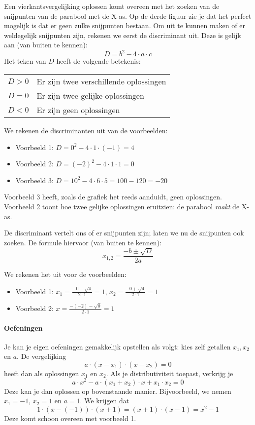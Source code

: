 \documentclass[a4paper]{article}
\begin{document}
Een vierkantsvergelijking oplossen komt overeen met het zoeken van de snijpunten van de parabool
met de X-as. Op de derde figuur zie je dat het perfect mogelijk is dat er geen zulke snijpunten bestaan.
Om uit te kunnen maken of er weldegelijk snijpunten zijn, rekenen we eerst de discriminant uit.
Deze is gelijk aan (van buiten te kennen):
\[
  D = b^2 - 4 \cdot a \cdot c
\]
Het teken van $D$ heeft de volgende betekenis:
\begin{center}
  \begin{tabular}{cl}
    $D > 0$ & Er zijn twee verschillende oplossingen \\
    $D = 0$ & Er zijn twee gelijke oplossingen \\
    $D < 0$ & Er zijn geen oplossingen
  \end{tabular}
\end{center}
We rekenen de discriminanten uit van de voorbeelden:
\begin{itemize}
  \item Voorbeeld 1: $D = 0^2 - 4 \cdot 1 \cdot (-1) = 4$
  \item Voorbeeld 2: $D = (-2)^2 - 4 \cdot 1 \cdot 1 = 0$
  \item Voorbeeld 3: $D = 10^2 - 4 \cdot 6 \cdot 5 = 100 - 120 = -20$
\end{itemize}

Voorbeeld 3 heeft, zoals de grafiek het reeds aanduidt, geen oplossingen. Voorbeeld 2 toont hoe twee gelijke oplossingen
eruitzien: de parabool \emph{raakt} de X-as.

De discriminant vertelt ons of er snijpunten zijn; laten we nu de snijpunten ook zoeken. De formule hiervoor (van buiten te kennen):
\[
  x_{1,2} = \frac{-b \pm \sqrt{D}}{2a}
\]

We rekenen het uit voor de voorbeelden:
\begin{itemize}
  \item Voorbeeld 1: $x_1 = \frac{-0-\sqrt{4}}{2\cdot 1} = 1$, $x_2 = \frac{-0+\sqrt{4}}{2\cdot 1} = 1$
  \item Voorbeeld 2: $x = \frac{-(-2)-\sqrt{0}}{2\cdot 1} = 1$
\end{itemize}

\paragraph{Oefeningen}
Je kan je eigen oefeningen gemakkelijk opstellen als volgt: kies zelf getallen $x_1, x_2$ en $a$. De vergelijking
\[
  a \cdot (x-x_1)\cdot(x-x_2)=0
\]
heeft dan als oplossingen $x_1$ en $x_2$. Als je distributiviteit toepast, verkrijg je
\[
  a \cdot x^2 - a \cdot (x_1 + x_2) \cdot x + x_1 \cdot x_2 = 0
\]
Deze kan je dan oplossen op bovenstaande manier. Bijvoorbeeld, we nemen $x_1 = -1$, $x_2 = 1$ en $a = 1$.
We krijgen dat
\[
  1 \cdot (x - (-1)) \cdot (x + 1) = (x + 1) \cdot (x - 1) = x^2 - 1
\]
Deze komt schoon overeen met voorbeeld 1.
\end{document}
